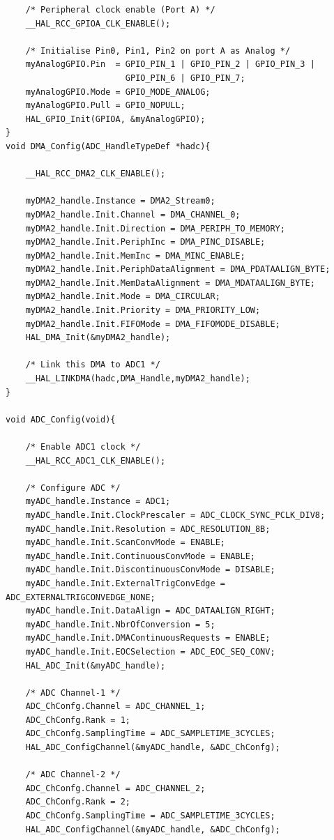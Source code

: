 \documentclass[12pt]{article}
\begin{document}
\begin{verbatim}
    /* Peripheral clock enable (Port A) */
    __HAL_RCC_GPIOA_CLK_ENABLE();
	
    /* Initialise Pin0, Pin1, Pin2 on port A as Analog */
    myAnalogGPIO.Pin  = GPIO_PIN_1 | GPIO_PIN_2 | GPIO_PIN_3 |
                        GPIO_PIN_6 | GPIO_PIN_7;
    myAnalogGPIO.Mode = GPIO_MODE_ANALOG;
    myAnalogGPIO.Pull = GPIO_NOPULL;
    HAL_GPIO_Init(GPIOA, &myAnalogGPIO);
}
void DMA_Config(ADC_HandleTypeDef *hadc){
	
    __HAL_RCC_DMA2_CLK_ENABLE();
	
    myDMA2_handle.Instance = DMA2_Stream0;
    myDMA2_handle.Init.Channel = DMA_CHANNEL_0;
    myDMA2_handle.Init.Direction = DMA_PERIPH_TO_MEMORY;
    myDMA2_handle.Init.PeriphInc = DMA_PINC_DISABLE;
    myDMA2_handle.Init.MemInc = DMA_MINC_ENABLE;
    myDMA2_handle.Init.PeriphDataAlignment = DMA_PDATAALIGN_BYTE;
    myDMA2_handle.Init.MemDataAlignment = DMA_MDATAALIGN_BYTE;
    myDMA2_handle.Init.Mode = DMA_CIRCULAR;
    myDMA2_handle.Init.Priority = DMA_PRIORITY_LOW;
    myDMA2_handle.Init.FIFOMode = DMA_FIFOMODE_DISABLE;
    HAL_DMA_Init(&myDMA2_handle);
	
    /* Link this DMA to ADC1 */
    __HAL_LINKDMA(hadc,DMA_Handle,myDMA2_handle);
}

void ADC_Config(void){
	
    /* Enable ADC1 clock */
    __HAL_RCC_ADC1_CLK_ENABLE();
	
    /* Configure ADC */
    myADC_handle.Instance = ADC1;
    myADC_handle.Init.ClockPrescaler = ADC_CLOCK_SYNC_PCLK_DIV8;
    myADC_handle.Init.Resolution = ADC_RESOLUTION_8B;
    myADC_handle.Init.ScanConvMode = ENABLE;
    myADC_handle.Init.ContinuousConvMode = ENABLE;
    myADC_handle.Init.DiscontinuousConvMode = DISABLE;
    myADC_handle.Init.ExternalTrigConvEdge =  ADC_EXTERNALTRIGCONVEDGE_NONE;
    myADC_handle.Init.DataAlign = ADC_DATAALIGN_RIGHT;
    myADC_handle.Init.NbrOfConversion = 5;
    myADC_handle.Init.DMAContinuousRequests = ENABLE;
    myADC_handle.Init.EOCSelection = ADC_EOC_SEQ_CONV;
    HAL_ADC_Init(&myADC_handle);
	
    /* ADC Channel-1 */
    ADC_ChConfg.Channel = ADC_CHANNEL_1;
    ADC_ChConfg.Rank = 1;
    ADC_ChConfg.SamplingTime = ADC_SAMPLETIME_3CYCLES;
    HAL_ADC_ConfigChannel(&myADC_handle, &ADC_ChConfg);

    /* ADC Channel-2 */
    ADC_ChConfg.Channel = ADC_CHANNEL_2;
    ADC_ChConfg.Rank = 2;
    ADC_ChConfg.SamplingTime = ADC_SAMPLETIME_3CYCLES;
    HAL_ADC_ConfigChannel(&myADC_handle, &ADC_ChConfg);
	

\end{verbatim}
\end{document}
